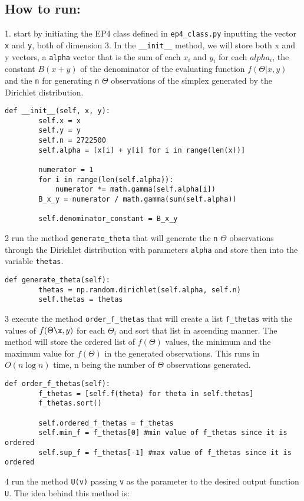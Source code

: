 \documentclass[12pt]{article}
\begin{document}
\subsection*{How to run:}
1. start by initiating the EP4 class defined in \texttt{ep4\_class.py} inputting the vector \texttt{x} and \texttt{y}, both of dimension 3. In the \texttt{\_\_init\_\_} method, we will store both x and y vectors, a \texttt{alpha} vector that is the sum of each $x_i$ and $y_i$ for each $alpha_i$, the constant $B(x + y)$ of the denominator of the evaluating function $f(\Theta|x, y)$ and the \texttt{n} for generating \texttt{n} $\Theta$ observations of the simplex generated by the Dirichlet distribution.\\
\begin{lstlisting}
def __init__(self, x, y):
		self.x = x
		self.y = y
		self.n = 2722500
		self.alpha = [x[i] + y[i] for i in range(len(x))]

		numerator = 1
		for i in range(len(self.alpha)):
			numerator *= math.gamma(self.alpha[i])
		B_x_y = numerator / math.gamma(sum(self.alpha))

		self.denominator_constant = B_x_y
\end{lstlisting}
2 run the method \texttt{generate\_theta} that will generate the \texttt{n} $\Theta$ observations through the Dirichlet distribution with parameters \texttt{alpha} and store then into the variable \texttt{thetas}.\\
\begin{lstlisting}
def generate_theta(self):
		thetas = np.random.dirichlet(self.alpha, self.n)
		self.thetas = thetas
\end{lstlisting}
3 execute the method \texttt{order\_f\_thetas} that will create a list \texttt{f\_thetas} with the values of $f(\Theta\x, y)$ for each $\Theta_i$ and sort that list in ascending manner. The method will store the ordered list of $f(\Theta)$ values, the minimum and the maximum value for $f(\Theta)$ in the generated observations. This runs in $O(n \log n)$ time, n being the number of $\Theta$ observations generated.
\begin{lstlisting}
def order_f_thetas(self):
		f_thetas = [self.f(theta) for theta in self.thetas]
		f_thetas.sort()

		self.ordered_f_thetas = f_thetas
		self.min_f = f_thetas[0] #min value of f_thetas since it is ordered
		self.sup_f = f_thetas[-1] #max value of f_thetas since it is ordered

\end{lstlisting}
4 run the method \texttt{U(v)} passing \texttt{v} as the parameter to the desired output function \texttt{U}. The idea behind this method is:\\
\end{document}
